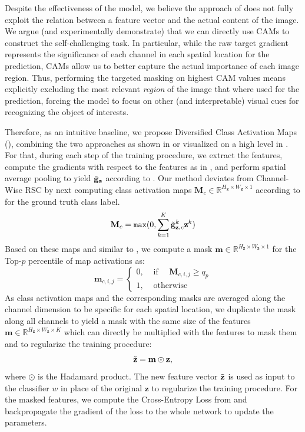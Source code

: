 Despite the effectiveness of the model, we believe the approach of \citet{huang2020selfchallenging} does not fully exploit the relation between a feature vector and the actual content of the image. We argue (and experimentally demonstrate) that we can directly use CAMs to construct the self-challenging task. In particular, while the raw target gradient represents the significance of each channel in each spatial location for the prediction, CAMs allow us to better capture the actual importance of each image region. Thus, performing the targeted masking on highest CAM values means explicitly excluding the most relevant \emph{region} of the image that where used for the prediction, forcing the model to focus on other (and interpretable) visual cues for recognizing the object of interests. 

Therefore, as an intuitive baseline, we propose Diversified Class Activation Maps (\divcam), combining the two approaches as shown in  or visualized on a high level in . For that, during each step of the training procedure, we extract the features, compute the gradients with respect to the features as in , and perform spatial average pooling to yield $\Tilde{\mathbf{g}}_\mathbf{z}$ according to . Our method deviates from Channel-Wise RSC by next computing class activation maps $\mathbf{M}_c \in \mathbb{R}^{H_\mathbf{z} \times W_\mathbf{z} \times 1}$ according to  for the ground truth class label.
\begin{equation}
\label{eq:Map}
    \mathbf{M}_c = \mathtt{max}(0,\sum_{k=1}^K\Tilde{\mathbf{g}}_{\mathbf{z},c}^k \mathbf{z}^k)
\end{equation}
Based on these maps and similar to , we compute a mask $\mathbf{m} \in \mathbb{R}^{H_\mathbf{z} \times W_\mathbf{z} \times 1}$ for the Top-$p$ percentile of map activations as: 
\begin{equation}
\mathbf{m}_{c,i,j}=\left\{\begin{array}{ll}
0, & \text { if } \quad \mathbf{M}_{c, i,j} \geq q_{p} \\
1, & \text { otherwise }
\end{array}\right.
\label{eq:MaskMap}
\end{equation}
As class activation maps and the corresponding masks are averaged along the channel dimension to be specific for each spatial location, we duplicate the mask along all channels to yield a mask with the same size of the features $\mathbf{m} \in \mathbb{R}^{H_\mathbf{z} \times W_\mathbf{z} \times K}$ which can directly be multiplied with the features to mask them and to regularize the training procedure:
\begin{equation}
\label{eq:mutate}
\Tilde{\mathbf{z}} = \mathbf{m} \odot \mathbf{z},
\end{equation}
where $\odot$ is the Hadamard product. The new feature vector $\Tilde{\mathbf{z}}$ is used as input to the classifier $w$ in place of the original $\mathbf{z}$ to regularize the training procedure. For the masked features, we compute the Cross-Entropy Loss from  and backpropagate the gradient of the loss to the whole network to update the parameters.

